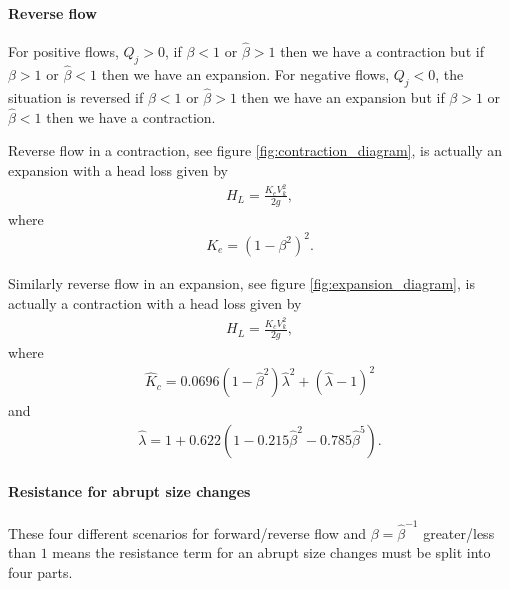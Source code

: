 \documentclass[12pt]{article}
\begin{document}
\paragraph{Reverse flow}

For positive flows, $Q_j > 0$, if $\beta < 1$ or $\hat{\beta} > 1$ then we have a contraction but if $\beta > 1$ or $\hat{\beta} < 1$ then we have an expansion. For negative flows, $Q_j < 0$, the situation is reversed if $\beta < 1$ or $\hat{\beta} > 1$ then we have an expansion but if $\beta > 1$ or $\hat{\beta} < 1$ then we have a contraction.

Reverse flow in a contraction, see figure \ref{fig:contraction_diagram}, is actually an expansion with a head loss given by
\begin{align}
H_L = \frac{K_e V_k^2}{2g},
\end{align}
where
\begin{align*}
K_e = \left(1 - \beta^2 \right)^2.
\end{align*}

Similarly reverse flow in an expansion, see figure \ref{fig:expansion_diagram}, is actually a contraction with a head loss given by
\begin{align}
H_L = \frac{\hat{K}_c V_k^2}{2g},
\end{align}
where 
\begin{align*}
\hat{K}_c = 0.0696 \left( 1 - \hat{\beta}^2 \right) \hat{\lambda}^2 + \left( \hat{\lambda} - 1 \right)^2
\end{align*}
and
\begin{align*}
\hat{\lambda} = 1 + 0.622 \left( 1 - 0.215 \hat{\beta}^2 - 0.785 \hat{\beta}^5 \right).
\end{align*}

\paragraph{Resistance for abrupt size changes}

These four different scenarios for forward/reverse flow and $\beta = \hat{\beta}^{-1}$ greater/less than $1$ means the resistance term for an abrupt size changes must be split into four parts. 
\end{document}
